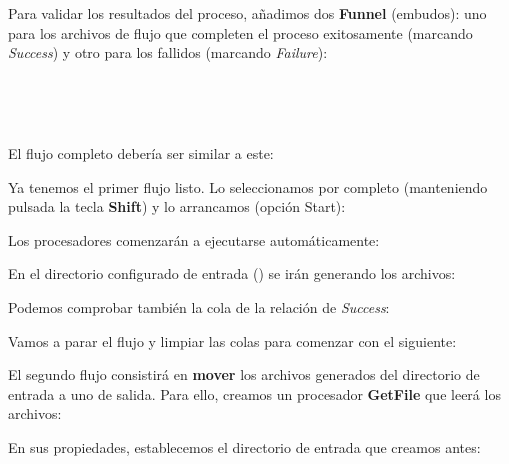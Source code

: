 \documentclass{../../miPlantilla}
\begin{document}

Para validar los resultados del proceso, añadimos dos \textbf{Funnel} (embudos): uno para los archivos de flujo que completen el proceso exitosamente (marcando \textit{Success}) y otro para los fallidos (marcando \textit{Failure}):

\begin{figure}[H]
    \centering
    \begin{minipage}{0.1\textwidth}  %
    \end{minipage}\hfill
    \begin{minipage}{0.8\textwidth}   %
    \end{minipage}
\end{figure}

\newpage

El flujo completo debería ser similar a este:


Ya tenemos el primer flujo listo. Lo seleccionamos por completo (manteniendo pulsada la tecla \textbf{Shift}) y lo arrancamos (opción Start):


Los procesadores comenzarán a ejecutarse automáticamente:


En el directorio configurado de entrada () se irán generando los archivos:


\newpage

Podemos comprobar también la cola de la relación de \textit{Success}:


Vamos a parar el flujo y limpiar las colas para comenzar con el siguiente:


El segundo flujo consistirá en \textbf{mover} los archivos generados del directorio de entrada a uno de salida. Para ello, creamos un procesador \textbf{GetFile} que leerá los archivos:


\newpage

En sus propiedades, establecemos el directorio de entrada que creamos antes:

\end{document}
